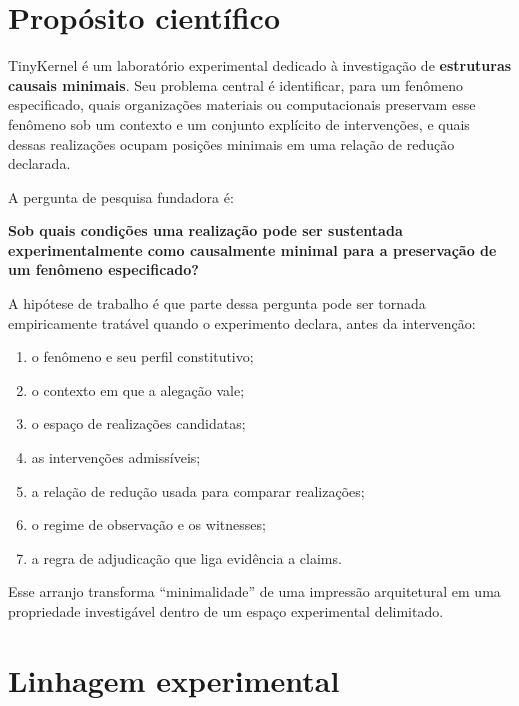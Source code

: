 \documentclass[11pt,a4paper]{article}
\begin{document}
\section{Propósito científico}

TinyKernel é um laboratório experimental dedicado à investigação de
\textbf{estruturas causais minimais}. Seu problema central é identificar, para um
fenômeno especificado, quais organizações materiais ou computacionais preservam esse
fenômeno sob um contexto e um conjunto explícito de intervenções, e quais dessas
realizações ocupam posições minimais em uma relação de redução declarada.

A pergunta de pesquisa fundadora é:

\begin{thesisbox}
\begin{center}
\large\bfseries
Sob quais condições uma realização pode ser sustentada experimentalmente como
causalmente minimal para a preservação de um fenômeno especificado?
\end{center}
\end{thesisbox}

A hipótese de trabalho é que parte dessa pergunta pode ser tornada empiricamente
tratável quando o experimento declara, antes da intervenção:

\begin{enumerate}
  \item o fenômeno e seu perfil constitutivo;
  \item o contexto em que a alegação vale;
  \item o espaço de realizações candidatas;
  \item as intervenções admissíveis;
  \item a relação de redução usada para comparar realizações;
  \item o regime de observação e os witnesses;
  \item a regra de adjudicação que liga evidência a claims.
\end{enumerate}

Esse arranjo transforma ``minimalidade'' de uma impressão arquitetural em uma
propriedade investigável dentro de um espaço experimental delimitado.

\section{Linhagem experimental}
\end{document}
